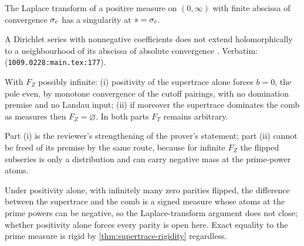 \begin{assumption}
\label{asm:landau-laplace}
The Laplace transform of a positive measure on $(0,\infty)$ with finite abscissa of
convergence $\sigma_c$ has a singularity at $s=\sigma_c$.
\end{assumption}

\begin{citedfact}
\label{cit:landau-dirichlet}
A Dirichlet series with nonnegative coefficients does not extend holomorphically to a
neighbourhood of its abscissa of absolute convergence \cite{maurizi2010landau}.
Verbatim: \texttt{} (\texttt{1009.0228:main.tex:177}).
\end{citedfact}

\begin{proposition}
\label{prop:parity-infinite-dominated}
With $F_Z$ possibly infinite: (i) positivity of the supertrace alone forces $b=0$, the
pole even, by monotone convergence of the cutoff pairings, with no domination premise and
no Landau input; (ii) if moreover the supertrace dominates the comb as measures then
$F_Z=\varnothing$. In both parts $F_T$ remains arbitrary.
\end{proposition}

Part (i) is the reviewer's strengthening of the prover's statement; part (ii) cannot be
freed of its premise by the same route, because for infinite $F_Z$ the flipped subseries
is only a distribution and can carry negative mass at the prime-power atoms.

\begin{observation}
\label{obs:parity-infinite-open}
Under positivity alone, with infinitely many zero parities flipped, the difference
between the supertrace and the comb is a signed measure whose atoms at the prime powers
can be negative, so the Laplace-transform argument does not close; whether positivity
alone forces every parity is open here. Exact equality to the prime measure is rigid by
\cref{thm:supertrace-rigidity} regardless.
\end{observation}

